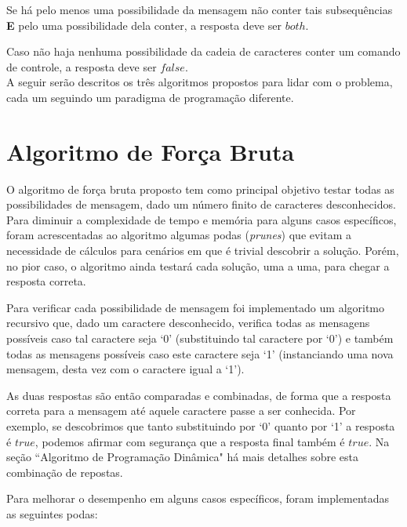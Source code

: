 \documentclass[a4paper,12pt,titlepage]{article}
\begin{document}
Se há pelo menos uma possibilidade da mensagem não conter tais subsequências \textbf{E} pelo uma possibilidade dela conter, a resposta deve ser $both$.

Caso não haja nenhuma possibilidade da cadeia de caracteres conter um comando de controle, a resposta deve ser $false$. \ \\

A seguir serão descritos os três algoritmos propostos para lidar com o problema, cada um seguindo um paradigma de programação diferente.

\section{Algoritmo de Força Bruta}

O algoritmo de força bruta proposto tem como principal objetivo testar todas as possibilidades de mensagem, dado um número finito de caracteres desconhecidos. Para diminuir a complexidade de tempo e memória para alguns casos específicos, foram acrescentadas ao algoritmo algumas podas (\textit{prunes}) que evitam a necessidade de cálculos para cenários em que é trivial descobrir a solução. Porém, no pior caso, o algoritmo ainda testará cada solução, uma a uma, para chegar a resposta correta.

Para verificar cada possibilidade de mensagem foi implementado um algoritmo recursivo que, dado um caractere desconhecido, verifica todas as mensagens possíveis caso tal caractere seja `0' (substituindo tal caractere por `0') e também todas as mensagens possíveis caso este caractere seja `1' (instanciando uma nova mensagem, desta vez com o caractere igual a `1').

As duas respostas são então comparadas e combinadas, de forma que a resposta correta para a mensagem até aquele caractere passe a ser conhecida. Por exemplo, se descobrimos que tanto substituindo por `0' quanto por `1' a resposta é $true$, podemos afirmar com segurança que a resposta final também é $true$. Na seção ``Algoritmo de Programação Dinâmica" há mais detalhes sobre esta combinação de repostas.

Para melhorar o desempenho em alguns casos específicos, foram implementadas as seguintes podas:
\end{document}
